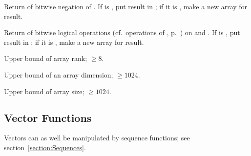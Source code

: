 \begin{LIST}{1cm}
  {
  Return  of bitwise negation of . If  is \T, put
  result in ; if it is \NIL, make a new array for
  result. 
  }

  {
  Return  of bitwise logical operations
  (cf.\ operations of , p.\ \pageref{section:Logic Functions}) on
   and  .  If  is \T, put result in
  ; if it is \NIL, make a new array for
  result. 
  }

  {
  Upper bound of array rank; $\geq 8$.
  }

  {
  Upper bound of an array dimension; $\geq 1024$.
  }

  {
  Upper bound of array size; $\geq 1024$.
  }

\end{LIST}


\subsection{Vector Functions} 

Vectors can as well be manipulated by sequence functions; see
section~\ref{section:Sequences}. 


